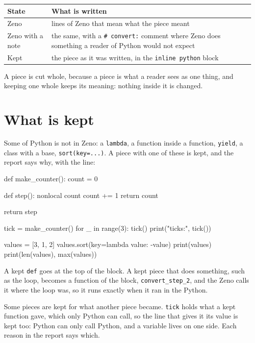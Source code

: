 \begin{center}
\begin{tabular}{lP{8cm}}
\toprule
State & What is written \\
\midrule
Zeno & lines of Zeno that mean what the piece meant \\
Zeno with a note & the same, with a \verb|# convert:| comment where
  Zeno does something a reader of Python would not expect \\
Kept & the piece as it was written, in the \verb|inline python|
  block \\
\bottomrule
\end{tabular}
\end{center}

A piece is cut whole, because a piece is what a reader sees as one
thing, and keeping one whole keeps its meaning: nothing inside it is
changed.

\section{What is kept}

Some of Python is not in Zeno: a \verb|lambda|, a function inside a
function, \verb|yield|, a class with a base, \verb|sort(key=...)|. A
piece with one of these is kept, and the report says why, with the
line:

\begin{zeno}[file=counter.py, dir=kept, show=no, cmd=zeno convert {file} ;; cat counter.zeno]
def make_counter():
    count = 0

    def step():
        nonlocal count
        count += 1
        return count

    return step


tick = make_counter()
for _ in range(3):
    tick()
print("ticks:", tick())

values = [3, 1, 2]
values.sort(key=lambda value: -value)
print(values)
print(len(values), max(values))
\end{zeno}

A kept \verb|def| goes at the top of the block. A kept piece that does
something, such as the loop, becomes a function of the block,
\verb|convert_step_2|, and the Zeno calls it where the loop was, so it
runs exactly when it ran in the Python.

Some pieces are kept for what another piece became. \verb|tick| holds
what a kept function gave, which only Python can call, so the line
that gives it its value is kept too: Python can only call Python, and
a variable lives on one side. Each reason in the report says which.

